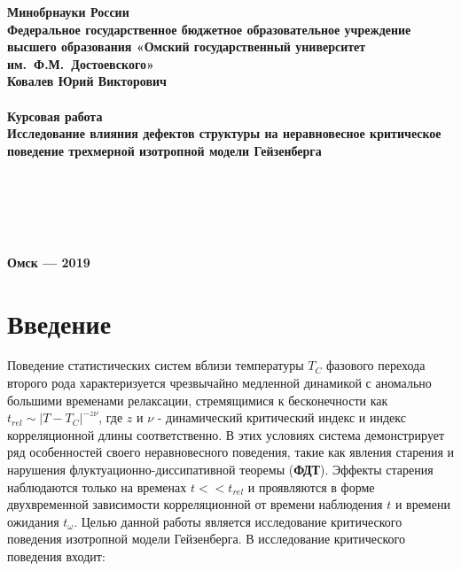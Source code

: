 \documentclass[a4paper,14pt]{extarticle}
\begin{document}
\begin{titlepage}
\begin{center}
{\bf{Минобрнауки России}\\[14pt]
Федеральное государственное бюджетное образовательное учреждение
высшего образования \linebreak
«Омский государственный университет им.~Ф.М.~Достоевского»
}\\[2.2cm]
{\bf Ковалев Юрий Викторович}\\[2mm]
{\footnotesize {}}\\[1cm]
{ \textbf{Курсовая работа}}\\[1cm]
{\large\bf Исследование влияния дефектов структуры на неравновесное критическое поведение трехмерной изотропной модели Гейзенберга}\\[2cm]
\end{center}
\hspace*{6cm}{\bf Научный руководитель:}\\
\hspace*{7cm}{\bf д.ф.-м.н, профессор В.В.~Прудников}\\[18pt]
\hspace*{6cm}{\bf Заведующий кафедрой :}\\
\hspace*{7cm}{\bf д.ф.-м.н., профессор В.В.~Прудников}\\[2cm]

\begin{center}
{\bf Омск — 2019}
\end{center}
\end{titlepage}

\newpage
\tableofcontents

\newpage
\section*{Введение}
Поведение статистических систем вблизи температуры $T_C$ фазового перехода второго рода характеризуется чрезвычайно медленной динамикой с аномально большими временами релаксации, стремящимися к бесконечности как $t_{rel} \sim {|T - T_C|}^{-z\nu}$, где $z$ и $\nu$ - динамический критический индекс и индекс корреляционной длины соответственно.
В этих условиях система демонстрирует ряд особенностей своего неравновесного поведения, такие как явления старения и нарушения флуктуационно-диссипативной теоремы (\textbf{ФДТ}).
Эффекты старения наблюдаются только на временах $t << t_{rel}$ и проявляются в форме двухвременной зависимости корреляционной от времени наблюдения $t$ и времени ожидания $t_{\omega}$.
Целью данной работы является исследование критического поведения изотропной модели Гейзенберга. В исследование критического поведения входит:
\end{document}
